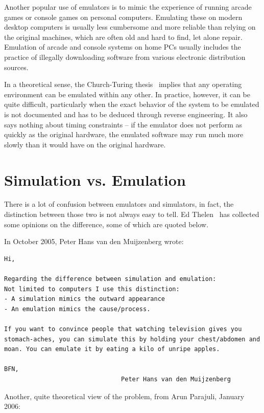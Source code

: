 Another  popular use of emulators is to mimic the experience of running arcade
games or console games on personal computers. Emulating these on modern desktop
computers is usually less cumbersome and more reliable than relying on the
original machines, which are often old and hard to find, let alone repair.
Emulation of arcade and console systems on home PCs usually includes the
practice of illegally downloading software from various electronic distribution
sources.

In a theoretical sense, the Church-Turing thesis~\cite{church-turing}
implies that any operating environment can be emulated within any other. In
practice, however, it can be quite difficult, particularly when the exact
behavior of the system to be emulated is not documented and has to be deduced
through reverse engineering. It also says nothing about timing constraints --
if the emulator does not perform as quickly as the original hardware, the
emulated software may run much more slowly than it would have on the original
hardware.


\section{Simulation vs. Emulation}
\label{sec:intro:intro:simvsemu}

There is a lot of confusion between emulators and simulators, in fact, the
distinction between those two is not always easy to tell. Ed
Thelen~\cite{emu-vs-simu} has collected some opinions on the difference, some of
which are quoted below.

In October 2005, Peter Hans van den Muijzenberg wrote:

\begin{verbatim}
Hi,

Regarding the difference between simulation and emulation:
Not limited to computers I use this distinction:
- A simulation mimics the outward appearance
- An emulation mimics the cause/process.

If you want to convince people that watching television gives you
stomach-aches, you can simulate this by holding your chest/abdomen and
moan. You can emulate it by eating a kilo of unripe apples.

BFN,
                                Peter Hans van den Muijzenberg
\end{verbatim}

Another, quite theoretical view of the problem, from Arun Parajuli, January
2006:

